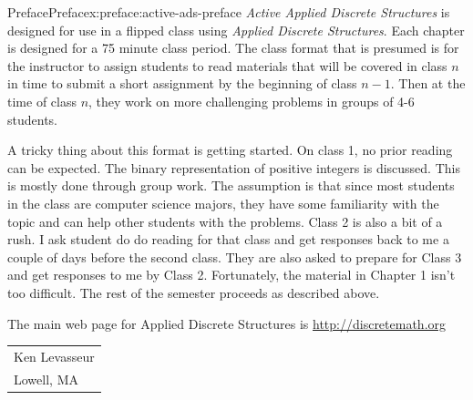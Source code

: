 \documentclass[oneside,10pt,]{book}
\numberwithin{equation}{section}
\begin{document}
\begin{preface}{Preface}{}{Preface}{}{}{x:preface:active-ads-preface}
\emph{Active Applied Discrete Structures} is designed for use in a flipped class using \emph{Applied Discrete Structures}. Each chapter is designed for a 75 minute class period.  The class format that is presumed is for the instructor to assign students to read materials that will be covered in class \(n\) in time to submit a short assignment by the beginning of class \(n-1\). Then at the time of class \(n\), they work on more challenging problems in groups of 4-6 students.%
\par
A tricky thing about this format is getting started. On class 1, no prior reading can be expected. The binary representation of positive integers is discussed. This is mostly done through group work. The assumption is that since most students in the class are computer science majors, they have some familiarity with the topic and can help  other students with the problems. Class 2 is also a bit of a rush. I ask student do do reading for that class and get responses back to me a couple of days before the second class. They are also asked to prepare for Class 3 and get responses to me by Class 2.   Fortunately, the material in Chapter 1 isn't too difficult.  The rest of the semester proceeds as described above.%
\par
The main web page for Applied Discrete Structures is \url{http://discretemath.org}%
\nopagebreak\par%
\hfill\begin{tabular}[t]{l@{}}
Ken Levasseur\\
Lowell, MA
\end{tabular}\\\par
\end{preface}
\setcounter{tocdepth}{1}
\renewcommand*\contentsname{Contents}
\tableofcontents
\mainmatter
%
%
\typeout{************************************************}
\typeout{************************************************}
%
\end{document}

